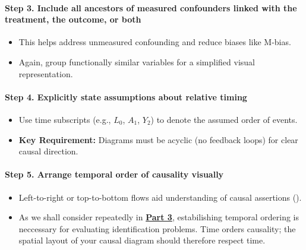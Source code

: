 \documentclass[
  singlecolumn]{article}
\let\oldparagraph\paragraph
\renewcommand{\paragraph}[1]{\oldparagraph{#1}\mbox{}}
\providecommand{\tightlist}{%
  \setlength{\itemsep}{0pt}\setlength{\parskip}{0pt}}\usepackage{longtable,booktabs,array}
\begin{document}
\paragraph{Step 3. Include all ancestors of measured confounders linked
with the treatment, the outcome, or
both}\label{step-3.-include-all-ancestors-of-measured-confounders-linked-with-the-treatment-the-outcome-or-both}

\begin{itemize}
\tightlist
\item
  This helps address unmeasured confounding and reduce biases like
  M-bias.
\item
  Again, group functionally similar variables for a simplified visual
  representation.
\end{itemize}

\paragraph{Step 4. Explicitly state assumptions about relative
timing}\label{step-4.-explicitly-state-assumptions-about-relative-timing}

\begin{itemize}
\tightlist
\item
  Use time subscripts (e.g., \(L_0\), \(A_1\), \(Y_2\)) to denote the
  assumed order of events.
\item
  \textbf{Key Requirement:} Diagrams must be acyclic (no feedback loops)
  for clear causal direction.
\end{itemize}

\paragraph{Step 5. Arrange temporal order of causality
visually}\label{step-5.-arrange-temporal-order-of-causality-visually}

\begin{itemize}
\tightlist
\item
  Left-to-right or top-to-bottom flows aid understanding of causal
  assertions ().
\item
  As we shall consider repeatedly in \hyperref[sec-part3]{\textbf{Part
  3}}, estabilishing temporal ordering is neccessary for evaluating
  identification problems. Time orders causality; the spatial layout of
  your causal diagram should therefore respect time.
\end{itemize}
\end{document}
